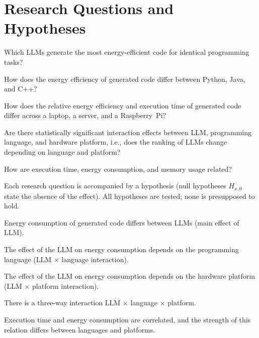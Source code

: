 \section{Research Questions and Hypotheses}
\label{sec:rqs}

\begin{description}[leftmargin=1.2cm,style=nextline]
  \item[\RQ{1}] Which LLMs generate the most energy-efficient code for identical
        programming tasks?
  \item[\RQ{2}] How does the energy efficiency of generated code differ between
        Python, Java, and C++?
  \item[\RQ{3}] How does the relative energy efficiency and execution time of generated
        code differ across a laptop, a server, and a Raspberry~Pi?
  \item[\RQ{4}] Are there statistically significant interaction effects between LLM,
        programming language, and hardware platform, i.e., does the ranking of LLMs
        change depending on language and platform?
  \item[\RQ{5}] How are execution time, energy consumption, and memory usage related?
\end{description}

\noindent
Each research question is accompanied by a hypothesis (null hypotheses $H_{x,0}$ state
the absence of the effect). All hypotheses are tested; none is presupposed to hold.

\begin{description}[leftmargin=1.2cm,style=nextline]
  \item[\HYP{1} (\RQ{1})] Energy consumption of generated code differs between LLMs
        (main effect of LLM).
  \item[\HYP{2} (\RQ{2}, \RQ{4})] The effect of the LLM on energy consumption depends on
        the programming language (LLM $\times$ language interaction).
  \item[\HYP{3} (\RQ{3}, \RQ{4})] The effect of the LLM on energy consumption depends on
        the hardware platform (LLM $\times$ platform interaction).
  \item[\HYP{4} (\RQ{4})] There is a three-way interaction LLM $\times$ language
        $\times$ platform.
  \item[\HYP{5} (\RQ{5})] Execution time and energy consumption are correlated, and the
        strength of this relation differs between languages and platforms.
\end{description}

